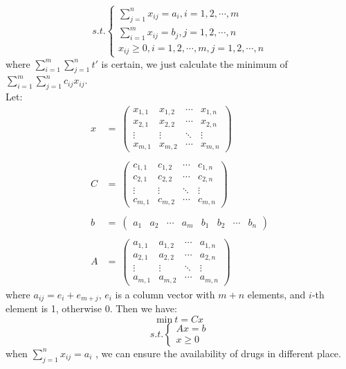 $$
s.t. \left\{
\begin{array}{l}
  \sum_{j=1}^{n}x_{ij}=a_i,i=1,2,\cdots,m \\
  \sum_{i=1}^{m}x_{ij}=b_j,j=1,2,\cdots,n \\
  x_{ij}\geq 0,i=1,2,\cdots,m, j=1,2,\cdots,n
\end{array}\right.
$$
where $ \sum_{i=1}^{m}\sum_{j=1}^{n}t' $ is certain, 
we just calculate the minimum of 
$ \sum_{i=1}^{m}\sum_{j=1}^{n}c_{ij}x_{ij} $.\\
Let:
$$
\begin{array}{ll}
x & = ~\begin{pmatrix}
	  x_{1,1} & x_{1,2} & \cdots & x_{1,n} \\
	  x_{2,1} & x_{2,2} & \cdots & x_{2,n} \\
	  \vdots  & \vdots  & \ddots & \vdots  \\
	  x_{m,1} & x_{m,2} & \cdots & x_{m,n}
	 \end{pmatrix}\\\\
C & = ~\begin{pmatrix}
	  c_{1,1} & c_{1,2} & \cdots & c_{1,n} \\
	  c_{2,1} & c_{2,2} & \cdots & c_{2,n} \\
	  \vdots  & \vdots  & \ddots & \vdots  \\
	  c_{m,1} & c_{m,2} & \cdots & c_{m,n}
	 \end{pmatrix}\\\\
b & = ~\begin{pmatrix}
	  a_1 & a_2 & \cdots & a_m & b_1 & b_2 & \cdots & b_n
	 \end{pmatrix}\\\\
A & = ~\begin{pmatrix}
	  a_{1,1} & a_{1,2} & \cdots & a_{1,n} \\
	  a_{2,1} & a_{2,2} & \cdots & a_{2,n} \\
	  \vdots  & \vdots  & \ddots & \vdots  \\
	  a_{m,1} & a_{m,2} & \cdots & a_{m,n}
	 \end{pmatrix}
\end{array}
$$
where $ a_{ij}=e_i+e_{m+j} $, $ e_{i} $ is a column vector with
$ m+n $ elements, and $i$-th element is 1, otherwise 0. Then we
have:
$$
\mathrm{min}~t=Cx
$$
$$
s.t. \left\{\begin{array}{r}
  Ax=b\\
  x\geq 0
\end{array}\right.
$$
when $ \sum_{j=1}^{n}x_{ij}=a_i $ \cite{bib4}, we can ensure the
availability of drugs in different place.